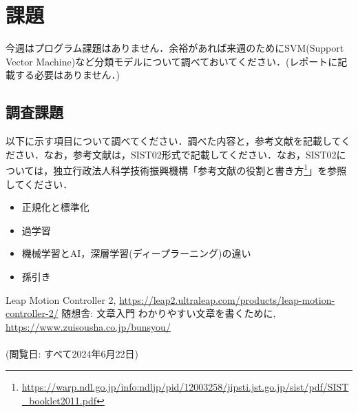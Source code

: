 \documentclass{jarticle}
\begin{document}
\section{課題}
今週はプログラム課題はありません．余裕があれば来週のためにSVM(Support Vector Machine)など分類モデルについて調べておいてください．(レポートに記載する必要はありません．)
\subsection{調査課題}
以下に示す項目について調べてください．調べた内容と，参考文献を記載してください．なお，参考文献は，SIST02形式で記載してください．なお，SIST02については，独立行政法人科学技術振興機構「参考文献の役割と書き方\footnote{\url{https://warp.ndl.go.jp/info:ndljp/pid/12003258/jipsti.jst.go.jp/sist/pdf/SIST\_booklet2011.pdf}}」を参照してください．
\begin{itemize}
  \item 正規化と標準化
  \item 過学習
  \item 機械学習とAI，深層学習(ディープラーニング)の違い
  \item 孫引き
\end{itemize}

\begin{thebibliography}{99}
   Leap Motion Controller 2, \url{https://leap2.ultraleap.com/products/leap-motion-controller-2/}
   随想舎: 文章入門 わかりやすい文章を書くために, \url{https://www.zuisousha.co.jp/bunsyou/} \\\\
  (閲覧日: すべて2024年6月22日)
\end{thebibliography}
\end{document}
